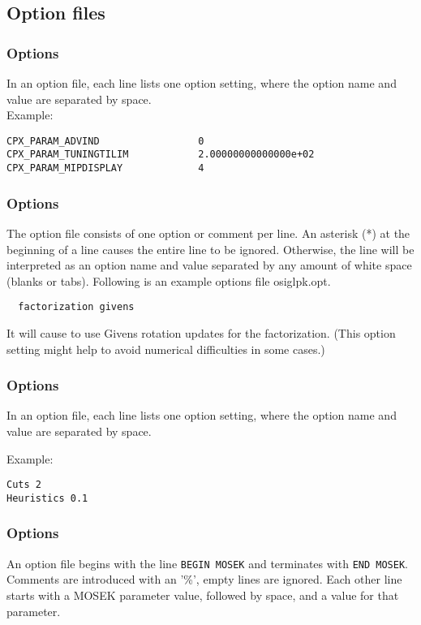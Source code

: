 \subsection{Option files}
\label{sub:osioptions}

\subsubsection{\OSICPLEX Options}
In an \OSICPLEX option file, each line lists one option setting, where the option name and value are separated by space.\\
Example:
\begin{verbatim}
CPX_PARAM_ADVIND                 0
CPX_PARAM_TUNINGTILIM            2.00000000000000e+02
CPX_PARAM_MIPDISPLAY             4
\end{verbatim}

\subsubsection{\OSIGLPK Options}

The \OSIGLPK option file consists of one option or comment per line.
An asterisk (*) at the beginning of a line causes the entire line to be ignored.
Otherwise, the line will be interpreted as an option name and value separated by any amount of white space (blanks or tabs).
Following is an example options file osiglpk.opt.
\begin{verbatim}
  factorization givens
\end{verbatim}
It will cause \OSIGLPK to use Givens rotation updates for the factorization. (This option setting might help to avoid numerical difficulties in some cases.)



\subsubsection{\OSIGUROBI Options}
In an \OSICPLEX option file, each line lists one option setting, where the option name and value are separated by space.

Example:
\begin{verbatim}
Cuts 2
Heuristics 0.1
\end{verbatim}

\subsubsection{\OSIMOSEK Options}
An \OSIMOSEK option file begins with the line \texttt{BEGIN MOSEK} and terminates with \texttt{END MOSEK}.
Comments are introduced with an '\%', empty lines are ignored.
Each other line starts with a MOSEK parameter value, followed by space, and a value for that parameter.

